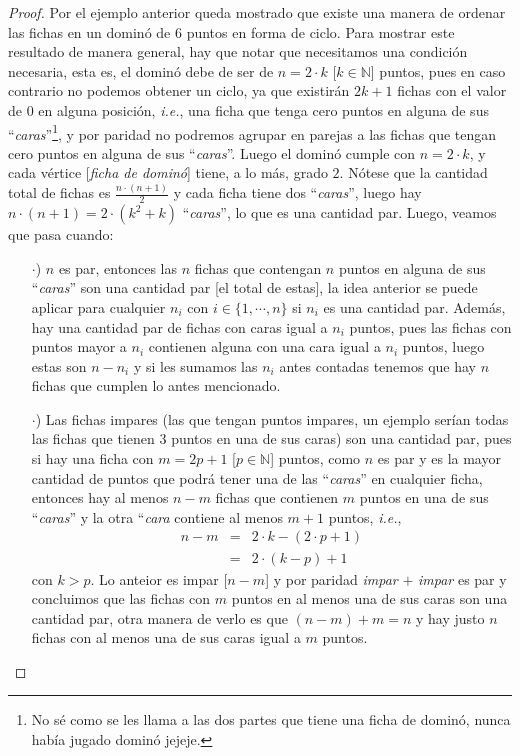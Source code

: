 \documentclass{article}
\begin{document}
\begin{enumerate}
\begin{proof}
    Por el ejemplo anterior queda mostrado que existe una manera de ordenar
    las fichas en un dominó de $6$ puntos en forma de ciclo. Para mostrar
    este resultado de manera general, hay que notar que necesitamos una
    condición necesaria, esta es, el dominó debe de ser de $n = 2 \cdot k$
    [$k \in \mathbb{N}$] puntos, pues en caso contrario no podemos obtener
    un ciclo, ya que existirán $2k +1$ fichas con el valor de $0$ en alguna
    posición, \textit{i.e.}, una ficha que tenga cero puntos en alguna de
    sus ``\textit{caras}''\footnote{No sé como se les llama a las dos partes
      que tiene una ficha de dominó, nunca había jugado dominó jejeje.}, y por
    paridad no podremos agrupar en parejas a las fichas que tengan cero puntos
    en alguna de sus ``\textit{caras}''. Luego el dominó cumple con
    $n = 2 \cdot k$, y cada vértice [\textit{ficha de dominó}] tiene, a lo
    más, grado $2$. Nótese que la cantidad total de fichas es $\frac{n \cdot (n +1)}{2}$
    y cada ficha tiene dos ``\textit{caras}'', luego hay
    $n \cdot (n +1) = 2 \cdot (k^2 + k)$ ``\textit{caras}'', lo que es una cantidad
    par. Luego, veamos que pasa cuando:
    \begin{itemize}
    \item[$\cdot$)] $n$ es par, entonces las $n$ fichas que contengan $n$ puntos en
      alguna de sus ``\textit{caras}'' son una cantidad par [el total de estas], la idea
      anterior se puede aplicar para cualquier $n_i$ con $i \in \{1, \dotsm, n\}$ si $n_i$
      es una cantidad par. Además, hay una cantidad par de fichas con caras igual a $n_i$
      puntos, pues las fichas con puntos mayor a $n_i$ contienen alguna con una cara igual
      a $n_i$ puntos, luego estas son $n - n_i$ y si les sumamos las $n_i$ antes contadas
      tenemos que hay $n$ fichas que cumplen lo antes mencionado.

    \item[$\cdot$)] Las fichas impares (las que tengan puntos impares, un ejemplo serían
      todas las fichas que tienen $3$ puntos en una de sus caras) son una cantidad par, pues
      si hay una ficha con $m = 2p +1$ [$p \in \mathbb{N}$] puntos, como $n$ es par y es la
      mayor cantidad de puntos que podrá tener una de las ``\textit{caras}'' en cualquier ficha,
      entonces hay al menos $n -m$ fichas que contienen $m$ puntos en una de sus ``\textit{caras}''
      y la otra ``\textit{cara} contiene al menos $m +1$ puntos, \textit{i.e.},
      \begin{eqnarray*}
        n - m &=& 2 \cdot k - (2 \cdot p +1)\\
        &=& 2 \cdot (k - p) + 1
      \end{eqnarray*}
      con $k > p$. Lo anteior es impar [$n -m$] y por paridad \textit{impar} $+$ \textit{impar}
      es par y concluimos que las fichas con $m$ puntos en al menos una de sus caras son una cantidad
      par, otra manera de verlo es que $(n -m) + m = n$ y hay justo $n$ fichas con al menos una de
      sus caras igual a $m$ puntos.
    \end{itemize}


\end{proof}
\end{enumerate}
\end{document}
